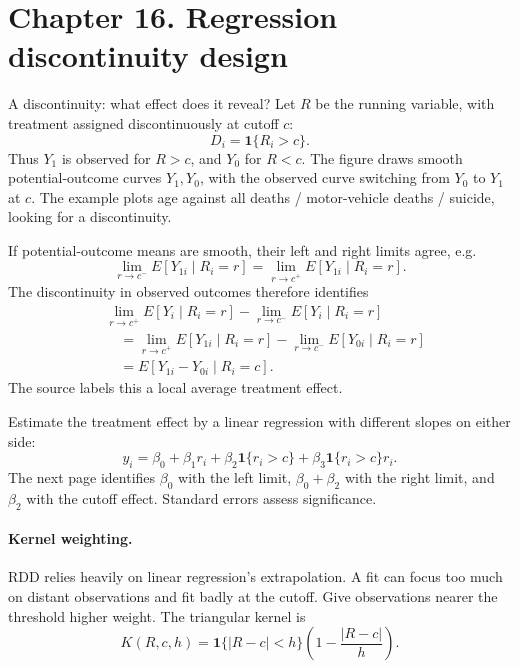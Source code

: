{\section{Chapter 16. Regression discontinuity design}
A discontinuity: what effect does it reveal? Let $R$ be the running variable, with treatment assigned discontinuously at cutoff $c$:
\[D_i=\mathbf1\{R_i>c\}.\]
 Thus $Y_1$ is observed for $R>c$, and $Y_0$ for $R<c$. The figure draws smooth potential-outcome curves $Y_1,Y_0$, with the observed curve switching from $Y_0$ to $Y_1$ at $c$. The example plots age against all deaths / motor-vehicle deaths / suicide, looking for a discontinuity.

If potential-outcome means are smooth, their left and right limits agree, e.g.
\[\lim_{r\to c^-}E[Y_{1i}\mid R_i=r]=\lim_{r\to c^+}E[Y_{1i}\mid R_i=r].\]
The discontinuity in observed outcomes therefore identifies
\begin{align*}
&\lim_{r\to c^+}E[Y_i\mid R_i=r]-\lim_{r\to c^-}E[Y_i\mid R_i=r]\\
&\quad=\lim_{r\to c^+}E[Y_{1i}\mid R_i=r]-\lim_{r\to c^-}E[Y_{0i}\mid R_i=r]\\
&\quad=E[Y_{1i}-Y_{0i}\mid R_i=c].
\end{align*}
The source labels this a local average treatment effect. 

Estimate the treatment effect by a linear regression with different slopes on either side:
\[y_i=\beta_0+\beta_1r_i+\beta_2\mathbf1\{r_i>c\}+\beta_3\mathbf1\{r_i>c\}r_i.\]
 The next page identifies $\beta_0$ with the left limit, $\beta_0+\beta_2$ with the right limit, and $\beta_2$ with the cutoff effect.  Standard errors assess significance.

\paragraph{Kernel weighting.}
RDD relies heavily on linear regression's extrapolation. A fit can focus too much on distant observations and fit badly at the cutoff. Give observations nearer the threshold higher weight. The triangular kernel is
\[K(R,c,h)=\mathbf1\{|R-c|<h\}\left(1-\frac{|R-c|}{h}\right).\]

}
